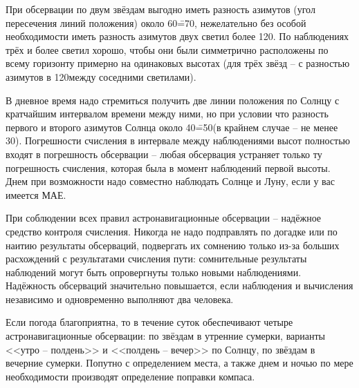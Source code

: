 При обсервации по двум звёздам выгодно иметь разность азимутов (угол
пересечения линий положения) около 60\==70\gr, нежелательно без особой
необходимости иметь разность азимутов двух светил более 120\gr. По
наблюдениях трёх и более светил хорошо, чтобы они были симметрично
расположены по всему горизонту примерно на одинаковых высотах (для
трёх звёзд \--- с разностью азимутов в 120\gr между соседними светилами).

В дневное время надо стремиться получить две линии положения по Солнцу
с кратчайшим интервалом времени между ними, но при условии что
разность первого и второго азимутов Солнца около 40\==50\gr (в крайнем
случае \--- не менее 30\gr). Погрешности счисления в интервале между
наблюдениями высот полностью входят в погрешность обсервации \--- любая
обсервация устраняет только ту погрешность счисления, которая была в
момент наблюдений первой высоты. Днем при возможности надо совместно
наблюдать Солнце и Луну, если у вас имеется МАЕ.

При соблюдении всех правил астронавигационные обсервации \--- надёжное
средство контроля счисления. Никогда не надо подправлять по догадке
или по наитию результаты обсерваций, подвергать их сомнению только
из-за больших расхождений с результатами счисления пути: сомнительные
результаты наблюдений могут быть опровергнуты только новыми
наблюдениями. Надёжность обсерваций значительно повышается, если
наблюдения и вычисления независимо и одновременно выполняют два
человека.

Если погода благоприятна, то в течение суток обеспечивают четыре
астронавигационные обсервации: по звёздам в утренние сумерки, варианты
<<утро \--- полдень>> и <<полдень \--- вечер>> по Солнцу, по звёздам в
вечерние сумерки. Попутно с определением места, а также днем и ночью
по мере необходимости производят определение поправки компаса.

\onecolumn

